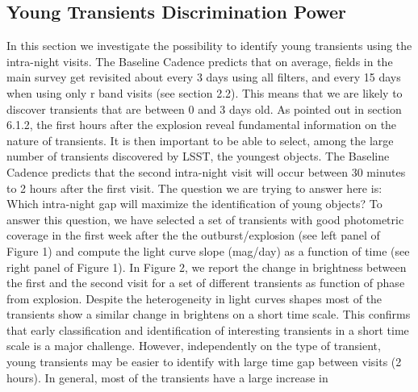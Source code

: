 %
%
%

\subsection{Young Transients Discrimination Power}
\def\secname{transientsAge}\label{sec:\secname}


In this section we investigate the possibility to identify young
transients using the intra-night visits. The Baseline Cadence predicts
that on average, fields in the main survey get revisited about every 3
days using all filters, and every 15 days when using only r band visits
(see section 2.2).  This means that we are likely to discover transients
that are between 0 and 3 days old. As pointed out in section 6.1.2, the
first hours after the explosion reveal fundamental information on the
nature of transients. It is then important to be able to select, among
the large number of transients discovered by LSST, the youngest objects.
The Baseline Cadence predicts that the second intra-night visit will
occur between 30 minutes to 2 hours after the first visit.  The question
we are trying to answer here is: Which intra-night gap will maximize the
identification of young objects? To answer this question, we have
selected a set of transients with good photometric coverage in the first
week after the the outburst/explosion (see left panel of Figure 1) and
compute the light curve slope (mag/day) as a function of time (see right
panel of Figure 1). In Figure 2,  we report the change in brightness
between the first and the second visit for a set of different transients
as function of phase from explosion. Despite the heterogeneity in light
curves shapes most of the transients show a similar change in brightens
on a short time scale. This confirms that early classification and
identification of interesting transients in a short time scale is a
major challenge. However, independently on the type of transient, young
transients may be easier to identify with large time gap between visits
(2 hours). In general, most of the transients have a large increase in
